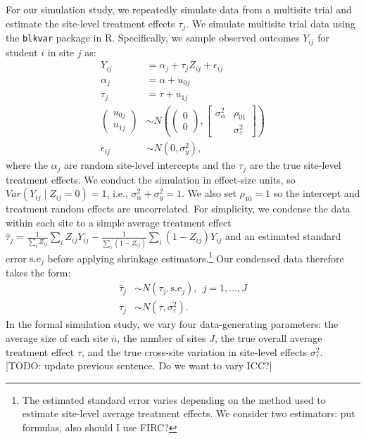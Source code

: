 \documentclass[]{article}
\begin{document}
For our simulation study, we repeatedly simulate data from a multisite trial and estimate the site-level treatment effects $\tau_j$.
We simulate multisite trial data using the \texttt{blkvar} package in R.
Specifically, we sample observed outcomes $Y_{ij}$ for student $i$ in site $j$ as:
\begin{align*}
	Y_{ij} &= \alpha_j + \tau_j Z_{ij} + \epsilon_{ij} \\
	\alpha_j &= \alpha + u_{0j} \\
	\tau_j &= \tau + u_{1j} \\
	\begin{pmatrix}
		u_{0j} \\ u_{1j}
	\end{pmatrix} &\sim N\left(
	\begin{pmatrix}
		0 \\ 0
	\end{pmatrix}, 
	\begin{bmatrix}
		\sigma^2_\alpha & \rho_{01} \\  & \sigma^2_\tau
	\end{bmatrix}\right) \\
	\epsilon_{ij} &\sim N(0, \sigma^2_y) ,
\end{align*}
where the $\alpha_j$ are random site-level intercepts and the $\tau_j$ are the true site-level treatment effects.
We conduct the simulation in effect-size units, so $Var(Y_{ij} \mid Z_{ij}=0)=1$, i.e., $\sigma^2_\alpha + \sigma^2_y = 1$.
We also set $\rho_{10}=1$ so the intercept and treatment random effects are uncorrelated.
For simplicity, we condense the data within each site to a simple average treatment effect $\hat{\tau}_j = \frac{1}{\sum_i Z_{ij}} \sum_i Z_{ij}Y_{ij} - \frac{1}{\sum_i (1-Z_{ij})} \sum_i (1-Z_{ij})Y_{ij} $ and an estimated standard error $\text{s.e}_j$ before applying shrinkage estimators.\footnote{The estimated standard error varies depending on the method used to estimate site-level average treatment effects.
We consider two estimators: put formulas, also should I use FIRC?}
Our condensed data therefore takes the form:
\begin{align*}
    \hat{\tau}_j &\sim N(\tau_j, \text{s.e}_j), \ \ j=1,\dots,J \\
    \tau_j &\sim N(\tau, \sigma_\tau^2).
\end{align*}
In the formal simulation study, we vary four data-generating parameters: the average size of each site $\bar{n}$, the number of sites $J$, the true overall average treatment effect $\tau$, and the true cross-site variation in site-level effects $\sigma^2_\tau$.
[TODO: update previous sentence. Do we want to vary ICC?]
\end{document}
